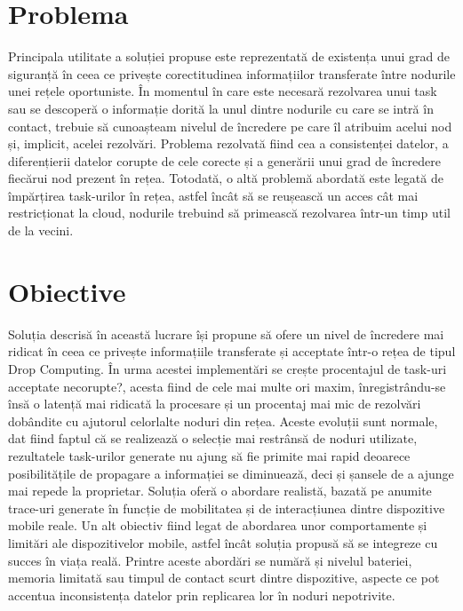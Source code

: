\documentclass[12pt,a4paper]{report}
\begin{document}
\section{Problema} 
Principala utilitate a soluției propuse este reprezentată de existența unui grad de siguranță în ceea ce privește corectitudinea informațiilor transferate între nodurile unei rețele oportuniste. În momentul în care este necesară rezolvarea unui task sau se descoperă o informație dorită la unul dintre nodurile cu care se intră în contact, trebuie să cunoașteam nivelul de încredere pe care îl atribuim acelui nod și, implicit, acelei rezolvări. Problema rezolvată fiind cea a consistenței datelor, a diferențierii datelor corupte de cele corecte și a generării unui grad de încredere fiecărui nod prezent în rețea. Totodată, o altă problemă abordată este legată de împărțirea task-urilor în rețea, astfel încât să se reușească un acces cât mai restricționat la cloud, nodurile trebuind să primească rezolvarea într-un timp util de la vecini.

\section{Obiective}
Soluția descrisă în această lucrare își propune să ofere un nivel de încredere mai ridicat în ceea ce privește informațiile transferate și acceptate într-o rețea de tipul Drop Computing. În urma acestei implementări se crește procentajul de task-uri acceptate necorupte?, acesta fiind de cele mai multe ori maxim, înregistrându-se însă o latență mai ridicată la procesare și un procentaj mai mic de rezolvări dobândite cu ajutorul celorlalte noduri din rețea. Aceste evoluții sunt normale, dat fiind faptul că se realizează o selecție mai restrânsă de noduri utilizate, rezultatele task-urilor generate nu ajung să fie primite mai rapid deoarece posibilitățile de propagare a informației se diminuează, deci și șansele de a ajunge mai repede la proprietar. Soluția oferă o abordare realistă, bazată pe anumite trace-uri generate în funcție de mobilitatea și de interacțiunea dintre dispozitive mobile reale. Un alt obiectiv fiind legat de abordarea unor comportamente și limitări ale dispozitivelor mobile, astfel încât soluția propusă să se integreze cu succes în viața reală. Printre aceste abordări se numără și nivelul bateriei, memoria limitată sau timpul de contact scurt dintre dispozitive, aspecte ce pot accentua inconsistența datelor prin replicarea lor în noduri nepotrivite.
\end{document}
